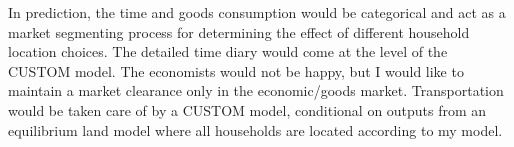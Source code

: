 In prediction, the time and goods consumption would be categorical and act as a market segmenting process for determining the effect of different household location choices. The detailed time diary would come at the level of the CUSTOM model. The economists would not be happy, but I would like to maintain a market clearance only in the economic/goods market. Transportation would be taken care of by a CUSTOM model, conditional on outputs from an equilibrium land model where all households are located according to my model.



